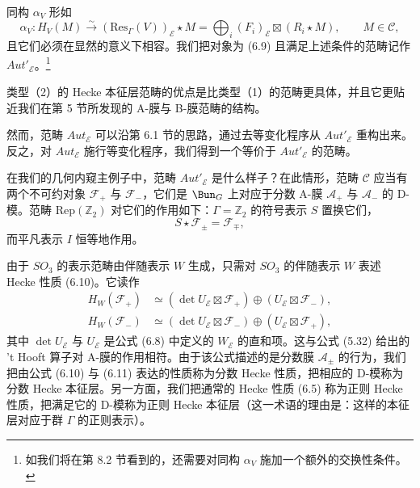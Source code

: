 
同构 $\alpha_V$ 形如
\begin{equation}\tag{6.10}
\alpha_V : H_V(M)\xrightarrow{\sim}(\mathrm{Res}_\Gamma(V))_{\mathcal{E}}\star M = \bigoplus_i(F_i)_{\mathcal{E}}\boxtimes(R_i\star M),\qquad M\in\mathcal{C},
\end{equation}
且它们必须在显然的意义下相容。我们把对象为 (6.9) 且满足上述条件的范畴记作 $Aut'_{\mathcal{E}}$。\footnote{如我们将在第 8.2 节看到的，还需要对同构 $\alpha_V$ 施加一个额外的交换性条件。}


类型（2）的 Hecke 本征层范畴的优点是比类型（1）的范畴更具体，并且它更贴近我们在第 5 节所发现的 A-膜与 B-膜范畴的结构。

然而，范畴 $Aut_{\mathcal{E}}$ 可以沿第 6.1 节的思路，通过去等变化程序从 $Aut'_{\mathcal{E}}$ 重构出来。反之，对 $Aut_{\mathcal{E}}$ 施行等变化程序，我们得到一个等价于 $Aut'_{\mathcal{E}}$ 的范畴。

在我们的几何内窥主例子中，范畴 $Aut'_{\mathcal{E}}$ 是什么样子？在此情形，范畴 $\mathcal{C}$ 应当有两个不可约对象 $\mathcal{F}_+$ 与 $\mathcal{F}_-$，它们是 $\Bun_G$ 上对应于分数 A-膜 $\mathcal{A}_+$ 与 $\mathcal{A}_-$ 的 D-模。范畴 $\mathrm{Rep}(\mathbb{Z}_2)$ 对它们的作用如下：$\Gamma = \mathbb{Z}_2$ 的符号表示 $S$ 置换它们，
\[
S\star\mathcal{F}_\pm = \mathcal{F}_\mp,
\]
而平凡表示 $I$ 恒等地作用。

由于 $SO_3$ 的表示范畴由伴随表示 $W$ 生成，只需对 $SO_3$ 的伴随表示 $W$ 表述 Hecke 性质 (6.10)。它读作
\begin{equation}\tag{6.11}
\begin{aligned}
H_W(\mathcal{F}_+) &\simeq (\det U_{\mathcal{E}}\boxtimes\mathcal{F}_+)\oplus(U_{\mathcal{E}}\boxtimes\mathcal{F}_-),\\
H_W(\mathcal{F}_-) &\simeq (\det U_{\mathcal{E}}\boxtimes\mathcal{F}_-)\oplus(U_{\mathcal{E}}\boxtimes\mathcal{F}_+),
\end{aligned}
\end{equation}
其中 $\det U_{\mathcal{E}}$ 与 $U_{\mathcal{E}}$ 是公式 (6.8) 中定义的 $W_{\mathcal{E}}$ 的直和项。这与公式 (5.32) 给出的 't Hooft 算子对 A-膜的作用相符。由于该公式描述的是分数膜 $\mathcal{A}_\pm$ 的行为，我们把由公式 (6.10) 与 (6.11) 表达的性质称为分数 Hecke 性质，把相应的 D-模称为分数 Hecke 本征层。另一方面，我们把通常的 Hecke 性质 (6.5) 称为正则 Hecke 性质，把满足它的 D-模称为正则 Hecke 本征层（这一术语的理由是：这样的本征层对应于群 $\Gamma$ 的正则表示）。

